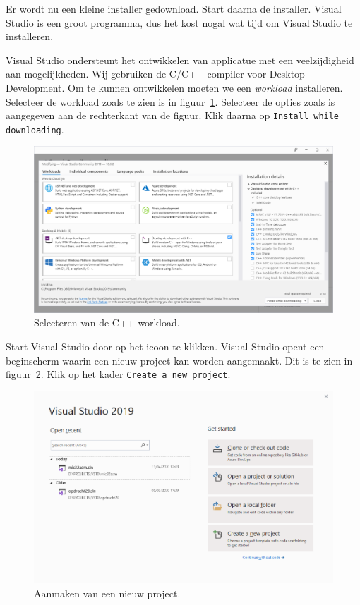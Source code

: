 \documentclass[a4paper,10pt,fleqn,twoside]{article}
\begin{document}
Er wordt nu een kleine installer gedownload. Start daarna de installer. Visual Studio is een groot programma, dus het kost nogal wat tijd om Visual Studio te installeren.

Visual Studio ondersteunt het ontwikkelen van applicatue met een veelzijdigheid aan mogelijkheden. Wij gebruiken de C/C++-compiler voor Desktop Development. Om te kunnen ontwikkelen moeten we een \textsl{workload} installeren. Selecteer de workload zoals te zien is in figuur~\ref{fig:000installworkload}. Selecteer de opties zoals is aangegeven aan de rechterkant van de figuur. Klik daarna op \texttt{Install while downloading}.

\begin{figure}[H]
\centering
\includegraphics[width=\textwidth]{000installworkload}
\caption{Selecteren van de C++-workload.}
\label{fig:000installworkload}
\end{figure}


Start Visual Studio door op het icoon te klikken. Visual Studio opent een beginscherm waarin een nieuw project kan worden aangemaakt. Dit is te zien in figuur~\ref{fig:001newproject}. Klik op het kader \texttt{Create a new project}.

\begin{figure}[H]
\centering
\includegraphics[scale=0.5]{001newproject}
\caption{Aanmaken van een nieuw project.}
\label{fig:001newproject}
\end{figure}
\end{document}
